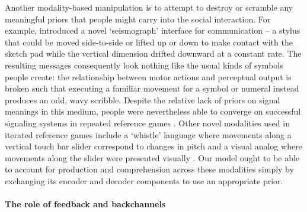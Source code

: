 
Another modality-based manipulation is to attempt to destroy or scramble any meaningful priors that people might carry into the social interaction.
For example,  introduced a novel `seismograph' interface for communication -- a stylus that could be moved side-to-side or lifted up or down to make contact with the sketch pad while the vertical dimension drifted downward at a constant rate.
The resulting messages consequently look nothing like the usual kinds of symbols people create: the relationship between motor actions and perceptual output is broken such that executing a familiar movement for a symbol or numeral instead produces an odd, wavy scribble.
Despite the relative lack of priors on signal meanings in this medium, people were nevertheless able to converge on successful signaling systems in repeated reference games \cite{RobertsGalantucci12_DualityOfPatterning,RobertsEtAl15_IconocityOnCombinatoriality}.
Other novel modalities used in iterated reference games include a `whistle' language where movements along a vertical touch bar slider correspond to changes in pitch \cite{VerhoefRobertsDingemanse15_Iconicity} and a visual analog where movements along the slider were presented visually \cite{VerhoefEtAl16_TemporalLanguage}.
Our model ought to be able to account for production and comprehension across these modalities simply by exchanging its encoder and decoder components to use an appropriate prior.

\paragraph{The role of feedback and backchannels}

